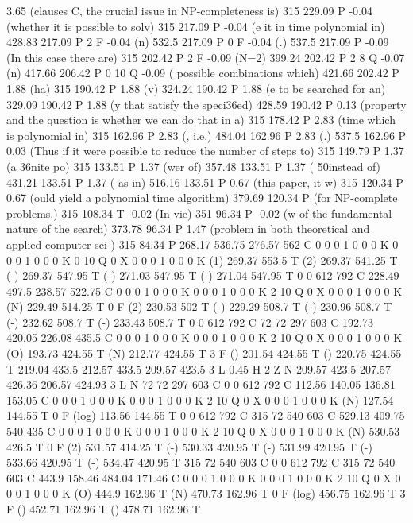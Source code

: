 3.65 (clauses C, the crucial issue in NP-completeness is) 315 229.09 P
-0.04 (whether it is possible to solv) 315 217.09 P
-0.04 (e it in time polynomial in) 428.83 217.09 P
2 F
-0.04 (n) 532.5 217.09 P
0 F
-0.04 (.) 537.5 217.09 P
-0.09 (In this case there are) 315 202.42 P
2 F
-0.09 (N=2) 399.24 202.42 P
2 8 Q
-0.07 (n) 417.66 206.42 P
0 10 Q
-0.09 ( possible combinations which) 421.66 202.42 P
1.88 (ha) 315 190.42 P
1.88 (v) 324.24 190.42 P
1.88 (e to be searched for an) 329.09 190.42 P
1.88 (y that satisfy the speci\336ed) 428.59 190.42 P
0.13 (property and the question is whether we can do that in a) 315 178.42 P
2.83 (time which is polynomial in) 315 162.96 P
2.83 (, i.e.) 484.04 162.96 P
2.83 (.) 537.5 162.96 P
0.03 (Thus if it were possible to reduce the number of steps to) 315 149.79 P
1.37 (a \336nite po) 315 133.51 P
1.37 (wer of) 357.48 133.51 P
1.37 ( \050instead of) 431.21 133.51 P
1.37 ( as in) 516.16 133.51 P
0.67 (this paper, it w) 315 120.34 P
0.67 (ould yield a polynomial time algorithm) 379.69 120.34 P
(for NP-complete problems.) 315 108.34 T
-0.02 (In vie) 351 96.34 P
-0.02 (w of the fundamental nature of the search) 373.78 96.34 P
1.47 (problem in both theoretical and applied computer sci-) 315 84.34 P
268.17 536.75 276.57 562 C
0 0 0 1 0 0 0 K
0 0 0 1 0 0 0 K
0 10 Q
0 X
0 0 0 1 0 0 0 K
(1) 269.37 553.5 T
(2) 269.37 541.25 T
(-) 269.37 547.95 T
(-) 271.03 547.95 T
(-) 271.04 547.95 T
0 0 612 792 C
228.49 497.5 238.57 522.75 C
0 0 0 1 0 0 0 K
0 0 0 1 0 0 0 K
2 10 Q
0 X
0 0 0 1 0 0 0 K
(N) 229.49 514.25 T
0 F
(2) 230.53 502 T
(-) 229.29 508.7 T
(-) 230.96 508.7 T
(-) 232.62 508.7 T
(-) 233.43 508.7 T
0 0 612 792 C
72 72 297 603 C
192.73 420.05 226.08 435.5 C
0 0 0 1 0 0 0 K
0 0 0 1 0 0 0 K
2 10 Q
0 X
0 0 0 1 0 0 0 K
(O) 193.73 424.55 T
(N) 212.77 424.55 T
3 F
() 201.54 424.55 T
() 220.75 424.55 T
219.04 433.5 212.57 433.5 209.57 423.5 3 L
0.45 H
2 Z
N
209.57 423.5 207.57 426.36 206.57 424.93 3 L
N
72 72 297 603 C
0 0 612 792 C
112.56 140.05 136.81 153.05 C
0 0 0 1 0 0 0 K
0 0 0 1 0 0 0 K
2 10 Q
0 X
0 0 0 1 0 0 0 K
(N) 127.54 144.55 T
0 F
(log) 113.56 144.55 T
0 0 612 792 C
315 72 540 603 C
529.13 409.75 540 435 C
0 0 0 1 0 0 0 K
0 0 0 1 0 0 0 K
2 10 Q
0 X
0 0 0 1 0 0 0 K
(N) 530.53 426.5 T
0 F
(2) 531.57 414.25 T
(-) 530.33 420.95 T
(-) 531.99 420.95 T
(-) 533.66 420.95 T
(-) 534.47 420.95 T
315 72 540 603 C
0 0 612 792 C
315 72 540 603 C
443.9 158.46 484.04 171.46 C
0 0 0 1 0 0 0 K
0 0 0 1 0 0 0 K
2 10 Q
0 X
0 0 0 1 0 0 0 K
(O) 444.9 162.96 T
(N) 470.73 162.96 T
0 F
(log) 456.75 162.96 T
3 F
() 452.71 162.96 T
() 478.71 162.96 T
